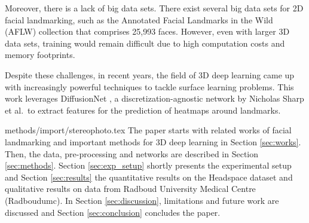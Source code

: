 Moreover, there is a lack of big data sets. There exist several big data sets for 2D facial landmarking, such as the Annotated Facial Landmarks in the Wild (AFLW) \cite{aflw} collection that comprises 25,993 faces. However, even with larger 3D data sets, training would remain difficult due to high computation costs and memory footprints.

Despite these challenges, in recent years, the field of 3D deep learning came up with increasingly powerful techniques to tackle surface learning problems. This work leverages DiffusionNet \cite{sharp2022diffusion}, a discretization-agnostic network by Nicholas Sharp et al.\, to extract features for the prediction of heatmaps around landmarks.








{methods/import/stereophoto.tex}
The paper starts with related works of facial landmarking and important methods for 3D deep learning in Section \ref{sec:works}. Then, the data, pre-processing and networks are described in Section \ref{sec:methods}. Section \ref{sec:exp_setup} shortly presents the experimental setup and Section \ref{sec:results} the quantitative results on the Headspace dataset and qualitative results on data from Radboud University Medical Centre (Radboudumc). In Section \ref{sec:discussion}, limitations and future work are discussed and Section \ref{sec:conclusion} concludes the paper.


